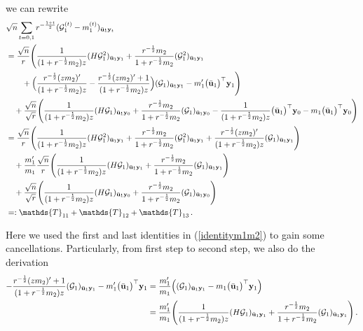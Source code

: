 \documentclass[12pt]{article}
\numberwithin{equation}{section}
\theoremstyle{remark}
\newcommand{\1}{{\rm 1}\kern-0.24em{\rm I}}
\begin{document}
\begin{appendices}
 we can rewrite
 \begin{align}\label{eq:Rewrite1}
  &\sqrt n \sum_{t=0,1}  r^{-\frac{1+t}{2}}  (\mathcal{G}_1^{(t)}-m_1^{(t)})_{\bar{\bf u}_1{\bf y}_t}  \notag\\
 &=\frac{\sqrt n}{ r}\Bigg( \frac{1}{(1+ r^{-\frac 12}m_2)z}({H}\mathcal{G}_1^2)_{\bar{\bf u}_1{\bf y}_1} + \frac{r^{-\frac 12}m_2}{1+ r^{-\frac 12}m_2}( \mathcal{G}_1^2)_{\bar{\bf u}_1{\bf y}_1} \notag\\
 &\qquad+ \Big(\frac{r^{-\frac 12}(zm_2)'}{(1+ r^{-\frac 12}m_2)z}-  \frac{r^{-\frac 12}(zm_2)'+1 }{(1+ r^{-\frac 12}m_2)z}\Big) (\mathcal{G}_1) _{\bar{\bf u}_1{\bf y}_1} - m_1' \big(\bar{\bf u}_1\big)^{\top} {\bf y}_1 \Bigg) \notag\\
 &\quad+ \frac{\sqrt n}{\sqrt r}\Bigg( \frac{1}{(1+ r^{-\frac 12}m_2)z}({H}\mathcal{G}_1)_{\bar{\bf u}_1{\bf y}_0} + \frac{r^{-\frac 12}m_2}{1+ r^{-\frac 12}m_2}( \mathcal{G}_1)_{\bar{\bf u}_1{\bf y}_0} - \frac{1}{(1+ r^{-\frac 12}m_2)z} \big(\bar{\bf u}_1\big)^{\top} {\bf y}_0 - m_1 \big(\bar{\bf u}_1\big)^{\top} {\bf y}_0\Bigg)\notag\\
 &= \frac{\sqrt n}{r}\Bigg( \frac{1}{(1+ r^{-\frac 12}m_2)z}({H}\mathcal{G}_1^2)_{\bar{\bf u}_1{\bf y}_1} + \frac{r^{-\frac 12}m_2}{1+ r^{-\frac 12}m_2}( \mathcal{G}_1^2)_{\bar{\bf u}_1{\bf y}_1} + \frac{r^{-\frac 12}(zm_2)'}{(1+ r^{-\frac 12}m_2)z} (\mathcal{G}_1) _{\bar{\bf u}_1{\bf y}_1} \Bigg)\notag\\
 &\quad +\frac{m_1'}{m_1}\frac{\sqrt n}{r} \Bigg( \frac{1}{(1+ r^{-\frac 12}m_2)z}({H}\mathcal{G}_1)_{\bar{\bf u}_1{\bf y}_1} + \frac{r^{-\frac 12}m_2}{1+ r^{-\frac 12}m_2}( \mathcal{G}_1)_{\bar{\bf u}_1{\bf y}_1} \Bigg)\notag\\
 &\quad 
 + \frac{\sqrt n}{\sqrt r} \Bigg( \frac{1}{(1+ r^{-\frac 12}m_2)z}({H}\mathcal{G}_1)_{\bar{\bf u}_1{\bf y}_0} + \frac{r^{-\frac 12}m_2}{1+ r^{-\frac 12}m_2}( \mathcal{G}_1)_{\bar{\bf u}_1{\bf y}_0} \Bigg)\notag\\
 &=: \mathds{T}_{11} + \mathds{T}_{12}  + \mathds{T}_{13}\,.
 \end{align}
 

 Here we used the first and last identities in (\ref{identitym1m2}) to gain some cancellations. Particularly, from first step to second step, we also do the derivation 
 \begin{align*}
 -  \frac{r^{-\frac 12}(zm_2)'+1 }{(1+ r^{-\frac 12}m_2)z}(\mathcal{G}_1) _{\bar{\bf u}_1{\bf y}_1} - m_1' \big(\bar{\bf u}_1\big)^{\top} {\bf y}_1 &= \frac{m_1'}{m_1} \Big((\mathcal{G}_1) _{\bar{\bf u}_1{\bf y}_1} -m_1\big(\bar{\bf u}_1\big)^{\top} {\bf y}_1 \Big)\notag\\
 &=\frac{m_1'}{m_1} \Bigg( \frac{1}{(1+ r^{-\frac 12}m_2)z}({H}\mathcal{G}_1)_{\bar{\bf u}_1{\bf y}_1} + \frac{r^{-\frac 12}m_2}{1+ r^{-\frac 12}m_2}( \mathcal{G}_1)_{\bar{\bf u}_1{\bf y}_1} \Bigg)\,.
 \end{align*}


\end{appendices}
\end{document}
